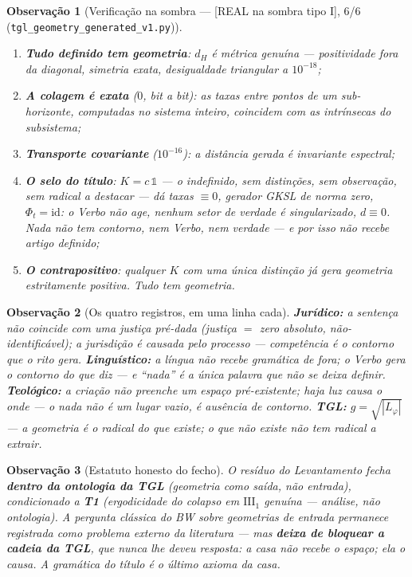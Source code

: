 \documentclass[11pt,a4paper]{article}
\newcommand{\SOMBRA}{\textsf{[REAL na sombra tipo I]}}
\newtheorem{remark}{Observação}
\begin{document}
\begin{remark}[Verificação na sombra --- \SOMBRA, 6/6
(\texttt{tgl\_geometry\_generated\_v1.py})]
\begin{enumerate}[noitemsep]
\item \textbf{Tudo definido tem geometria}: $d_H$ é métrica genuína ---
positividade fora da diagonal, simetria exata, desigualdade triangular a
$10^{-18}$;
\item \textbf{A colagem é exata} ($0$, bit a bit): as taxas entre pontos
de um sub-horizonte, computadas no sistema inteiro, coincidem com as
intrínsecas do subsistema;
\item \textbf{Transporte covariante} ($10^{-16}$): a distância gerada é
invariante espectral;
\item \textbf{O selo do título}: $K=c\,\mathbb 1$ --- o indefinido, sem
distinções, sem observação, sem radical a destacar --- dá taxas $\equiv
0$, gerador GKSL de norma \emph{zero}, $\Phi_t=\mathrm{id}$: o Verbo não
age, nenhum setor de verdade é singularizado, $d\equiv0$. \emph{Nada não
tem contorno, nem Verbo, nem verdade --- e por isso não recebe artigo
definido};
\item \textbf{O contrapositivo}: qualquer $K$ com uma única distinção já
gera geometria estritamente positiva. \emph{Tudo tem geometria.}
\end{enumerate}
\end{remark}

\begin{remark}[Os quatro registros, em uma linha cada]
\textbf{Jurídico:} a sentença não coincide com uma justiça pré-dada
(justiça $=$ zero absoluto, não-identificável); a jurisdição é
\emph{causada} pelo processo --- competência é o contorno que o rito
gera. \textbf{Linguístico:} a língua não recebe gramática de fora; o
Verbo gera o contorno do que diz --- e ``nada'' é a única palavra que
não se deixa definir. \textbf{Teológico:} a criação não preenche um
espaço pré-existente; \emph{haja luz} causa o \emph{onde} --- o nada não
é um lugar vazio, é ausência de contorno. \textbf{TGL:}
$g=\sqrt{|L_\varphi|}$ --- a geometria é o radical do que existe; o que
não existe não tem radical a extrair.
\end{remark}

\begin{remark}[Estatuto honesto do fecho]
O resíduo do Levantamento fecha \textbf{dentro da ontologia da TGL}
(geometria como saída, não entrada), condicionado a
\textbf{T1} (ergodicidade do colapso em $\mathrm{III}_1$ genuína ---
análise, não ontologia). A pergunta clássica do BW sobre geometrias
\emph{de entrada} permanece registrada como problema externo da
literatura --- mas \textbf{deixa de bloquear a cadeia da TGL}, que nunca
lhe deveu resposta: a casa não recebe o espaço; ela o causa. A gramática
do título é o último axioma da casa.
\end{remark}
\end{document}
